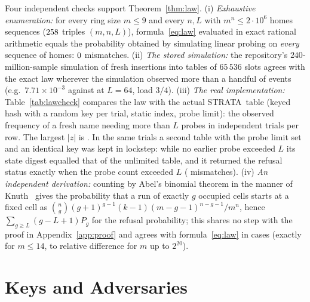\documentclass[11pt,a4paper]{article}
\theoremstyle{definition}
\theoremstyle{remark}
\newcommand{\st}{STRATA}
\begin{document}
Four independent checks support Theorem~\ref{thm:law}. (i) \emph{Exhaustive enumeration:} for every ring size $m\le 9$ and every $n,L$ with $m^n\le2\cdot10^6$ homes sequences ($258$ triples $(m,n,L)$), formula~\eqref{eq:law} evaluated in exact rational arithmetic equals the probability obtained by simulating linear probing on \emph{every} sequence of homes: $0$ mismatches. (ii) \emph{The stored simulation:} the repository's $240$-million-sample simulation of fresh insertions into tables of $65\,536$ slots agrees with the exact law wherever the simulation observed more than a handful of events (e.g.\ $7.71\times10^{-3}$ against \ExactAtSixtyFour{} at $L=64$, load $3/4$). (iii) \emph{The real implementation:} Table~\ref{tab:lawcheck} compares the law with the actual \st\ table (keyed hash with a random key per trial, static index, probe limit): the observed frequency of a fresh name needing more than $L$ probes in \LawCheckTrials{} independent trials per row. The largest $|z|$ is \LawCheckMaxZ. In the same trials a second table with the probe limit set and an identical key was kept in lockstep: while no earlier probe exceeded $L$ its state digest equalled that of the unlimited table, and it returned the refusal status exactly when the probe count exceeded $L$ (\LawCheckMismatch{} mismatches). (iv) \emph{An independent derivation:} counting by Abel's binomial theorem in the manner of Knuth~\cite{knuth3} gives the probability that a run of exactly $g$ occupied cells starts at a fixed cell as $\binom ng(g+1)^{g-1}(k-1)(m-g-1)^{n-g-1}/m^{n}$, hence $\sum_{g\ge L}(g-L+1)P_g$ for the refusal probability; this shares no step with the proof in Appendix~\ref{app:proof} and agrees with formula~\eqref{eq:law} in \KnuthCases{} cases (exactly for $m\le14$, to relative difference \KnuthWorst{} for $m$ up to $2^{20}$).

\begin{table}[t]
\centering\small
\caption{Exact law against the real table. $m$: index slots, $n$: keys already stored, $L$: probe limit. ``Clean'' trials are those in which no earlier insertion exceeded $L$ (used for the lockstep check).}\label{tab:lawcheck}

\end{table}

\section{Keys and Adversaries}\label{sec:keys}
\end{document}
